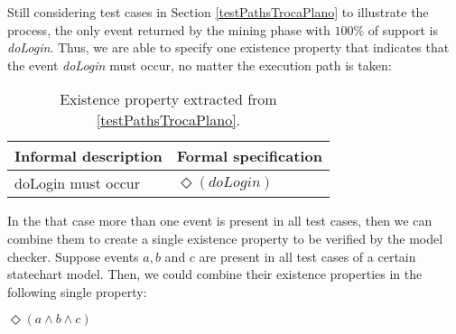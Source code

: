 Still considering test cases in Section \ref{testPathsTrocaPlano} to illustrate the process, the only event returned by the mining phase with $100\%$ of support is \textit{doLogin}. Thus, we are able to specify one existence property that indicates that the event \textit{doLogin} must occur, no matter the execution path is taken:

\begin{table}[h]
\begin{center}
\begin{tabular}{|l | l|}

\hline

Informal description & Formal specification \\ \hline

doLogin must occur & $\Diamond (doLogin)$ \\

\hline
\end{tabular}
\end{center}
\caption{Existence property extracted from \ref{testPathsTrocaPlano}.}
\label{existencePropertyTrocaPlano}
\end{table}

In the that case more than one event is present in all test cases, then we can combine them to create a single existence property to be verified by the model checker. Suppose events $a, b$ and $c$ are present in all test cases of a certain statechart model. Then, we could combine their existence properties in the following single property:

\begin{center}
$\Diamond (a \wedge b \wedge c)$
\end{center}

